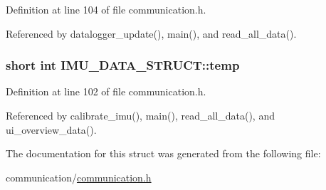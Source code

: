 Definition at line 104 of file communication.\-h.



Referenced by datalogger\-\_\-update(), main(), and read\-\_\-all\-\_\-data().

\hypertarget{structIMU__DATA__STRUCT_a81e1dbf765c1d947ca6076aa1bbc73e7}{
\subsubsection[{temp}]{\setlength{\rightskip}{0pt plus 5cm}short int I\-M\-U\-\_\-\-D\-A\-T\-A\-\_\-\-S\-T\-R\-U\-C\-T\-::temp}}\label{structIMU__DATA__STRUCT_a81e1dbf765c1d947ca6076aa1bbc73e7}


Definition at line 102 of file communication.\-h.



Referenced by calibrate\-\_\-imu(), main(), read\-\_\-all\-\_\-data(), and ui\-\_\-overview\-\_\-data().



The documentation for this struct was generated from the following file\-:\begin{DoxyCompactItemize}
\item 
communication/\hyperlink{communication_2communication_8h}{communication.\-h}\end{DoxyCompactItemize}
